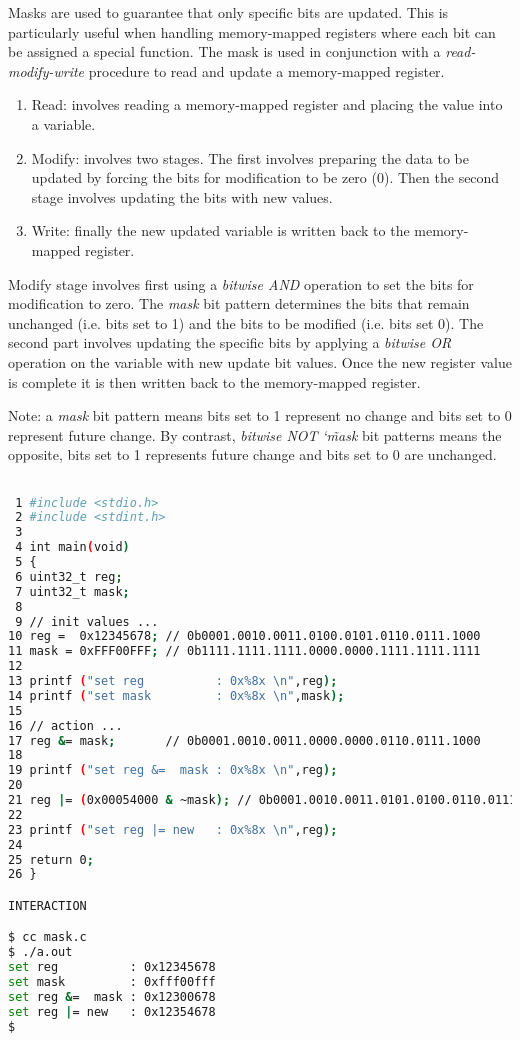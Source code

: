 Masks are used to guarantee that only specific bits are updated. This is particularly useful when handling memory-mapped registers where each bit can be assigned a special function. The mask is used in conjunction with a \textit{read-modify-write} procedure to read and update a memory-mapped register. 

\begin{enumerate}
\item Read: involves reading a memory-mapped register and placing the value into a variable.
\item Modify: involves two stages. The first involves preparing the data to be updated by forcing the bits for modification to be zero (0). Then the second stage involves updating the bits with new values.
\item Write: finally the new updated variable is written back to the memory-mapped register. 

\end{enumerate}

Modify stage involves first using a \textit{bitwise AND} operation to set the bits for modification to zero. The \textit{mask} bit pattern determines the bits that remain unchanged (i.e. bits set to 1) and the bits to be modified (i.e. bits set 0). The second part involves updating the specific bits by applying a \textit{bitwise OR} operation on the variable with new update bit values. Once the new register value is complete it is then written back to the memory-mapped register.

Note: a \textit{mask} bit pattern means bits set to 1 represent no change and bits set to 0 represent future change. By contrast, \textit{bitwise NOT} \textit{\char`\~mask} bit patterns means the opposite, bits set to 1 represents future change and bits set to 0 are unchanged.

\begin{lstlisting}[language=bash,showstringspaces=false,caption={File: mask.c},captionpos=b,label=mask]

 1 #include <stdio.h>
 2 #include <stdint.h>
 3 
 4 int main(void)
 5 {
 6 uint32_t reg;
 7 uint32_t mask;
 8 
 9 // init values ...
10 reg =  0x12345678; // 0b0001.0010.0011.0100.0101.0110.0111.1000
11 mask = 0xFFF00FFF; // 0b1111.1111.1111.0000.0000.1111.1111.1111
12 
13 printf ("set reg          : 0x%8x \n",reg);
14 printf ("set mask         : 0x%8x \n",mask);
15 
16 // action ...
17 reg &= mask;       // 0b0001.0010.0011.0000.0000.0110.0111.1000
18 
19 printf ("set reg &=  mask : 0x%8x \n",reg);
20 
21 reg |= (0x00054000 & ~mask); // 0b0001.0010.0011.0101.0100.0110.0111.1000
22 
23 printf ("set reg |= new   : 0x%8x \n",reg);
24 
25 return 0;
26 }

INTERACTION

$ cc mask.c
$ ./a.out
set reg          : 0x12345678 
set mask         : 0xfff00fff 
set reg &=  mask : 0x12300678 
set reg |= new   : 0x12354678 
$

\end{lstlisting}

